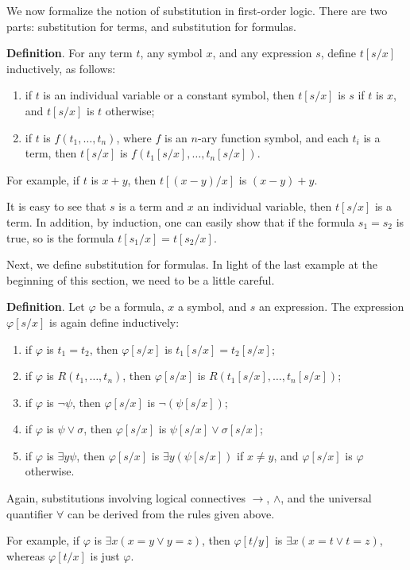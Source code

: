 \documentclass[12pt]{article}
\begin{document}
We now formalize the notion of substitution in first-order logic.  There are two parts: substitution for terms, and substitution for formulas.

\textbf{Definition}.  For any term $t$, any symbol $x$, and any expression $s$, define $t[s/x]$ inductively, as follows:
\begin{enumerate}
\item if $t$ is an individual variable or a constant symbol, then $t[s/x]$ is $s$ if $t$ is $x$, and $t[s/x]$ is $t$ otherwise;
\item if $t$ is $f(t_1,\ldots, t_n)$, where $f$ is an $n$-ary function symbol, and each $t_i$ is a term, then $t[s/x]$ is $f(t_1[s/x],\ldots, t_n[s/x])$.
\end{enumerate}

For example, if $t$ is $x+y$, then $t[(x-y)/x]$ is $(x-y)+y$.

It is easy to see that $s$ is a term and $x$ an individual variable, then $t[s/x]$ is a term.  In addition, by induction, one can easily show that if the formula $s_1=s_2$ is true, so is the formula $t[s_1/x]=t[s_2/x]$.

Next, we define substitution for formulas.  In light of the last example at the beginning of this section, we need to be a little careful.

\textbf{Definition}.  Let $\varphi$ be a formula, $x$ a symbol, and $s$ an expression.  The expression $\varphi[s/x]$ is again define inductively:
\begin{enumerate}
\item if $\varphi$ is $t_1=t_2$, then $\varphi[s/x]$ is $t_1[s/x]=t_2[s/x]$;
\item if $\varphi$ is $R(t_1,\ldots,t_n)$, then $\varphi[s/x]$ is $R(t_1[s/x],\ldots, t_n[s/x])$;
\item if $\varphi$ is $\neg \psi$, then $\varphi[s/x]$ is $\neg (\psi[s/x])$;
\item if $\varphi$ is $\psi \vee \sigma$, then $\varphi[s/x]$ is $\psi[s/x]\vee \sigma[s/x]$;
\item if $\varphi$ is $\exists y \psi$, then $\varphi[s/x]$ is $\exists y (\psi[s/x])$ if $x\ne y$, and $\varphi[s/x]$ is $\varphi$ otherwise.
\end{enumerate}
Again, substitutions involving logical connectives $\to$, $\wedge$, and the universal quantifier $\forall$ can be derived from the rules given above.

For example, if $\varphi$ is $\exists x (x=y \vee y=z)$, then $\varphi[t/y]$ is $\exists x (x=t \vee t=z)$, whereas $\varphi[t/x]$ is just $\varphi$.
\end{document}
